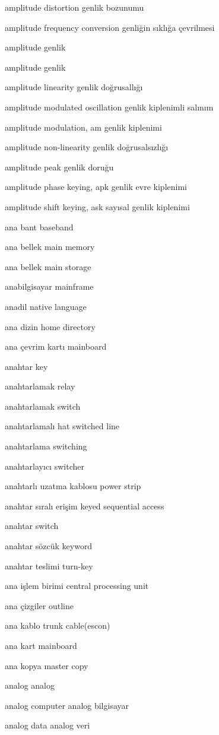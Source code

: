 \documentclass[12pt,fleqn]{article}\usepackage{../../common}
\begin{document}
amplitude distortion genlik bozunumu

amplitude frequency conversion genliğin sıklığa çevrilmesi

amplitude genlik

amplitude genlik

amplitude linearity genlik doğrusallığı

amplitude modulated oscillation genlik kiplenimli salınım

amplitude modulation, am genlik kiplenimi

amplitude non-linearity genlik doğrusalsızlığı

amplitude peak genlik doruğu

amplitude phase keying, apk genlik evre kiplenimi

amplitude shift keying, ask sayısal genlik kiplenimi

ana bant baseband

ana bellek main memory

ana bellek main storage

anabilgisayar mainframe

anadil native language

ana dizin home directory

ana çevrim kartı mainboard

anahtar key

anahtarlamak relay

anahtarlamak switch

anahtarlamalı hat switched line

anahtarlama switching

anahtarlayıcı switcher

anahtarlı uzatma kablosu power strip

anahtar sıralı erişim keyed sequential access

anahtar switch

anahtar sözcük keyword

anahtar teslimi turn-key

ana işlem birimi central processing unit

ana çizgiler outline

ana kablo trunk cable(escon)

ana kart mainboard

ana kopya master copy

analog analog

analog computer analog bilgisayar

analog data analog veri
\end{document}
